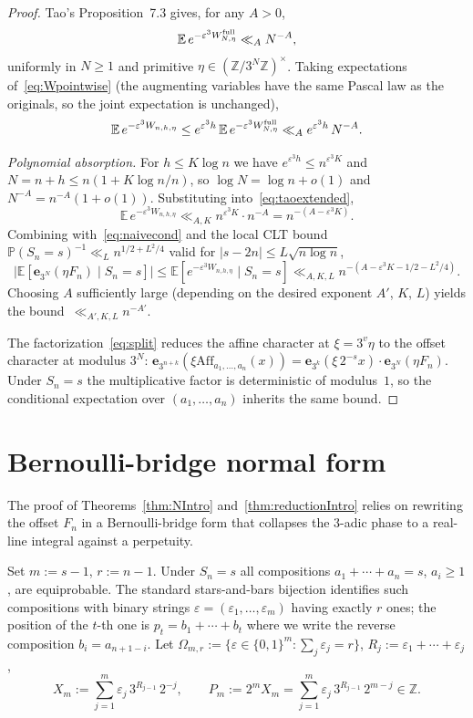 \documentclass[11pt,a4paper]{amsart}
\theoremstyle{plain}
\theoremstyle{definition}
\newcommand{\Z}{\mathbb{Z}}
\newcommand{\E}{\mathbb{E}}
\newcommand{\PP}{\mathbb{P}}
\newcommand{\Aff}{\mathrm{Aff}}
\begin{document}
\begin{proof}
Tao's Proposition~7.3 \cite[\S7.5]{Tao} gives, for any $A>0$,
\begin{equation}\label{eq:taop73}
\E\,e^{-\varepsilon^3 W^{\rm full}_{N,\eta}}\ll_A N^{-A},
\end{equation}
uniformly in $N\ge 1$ and primitive $\eta\in(\Z/3^N\Z)^\times$.
Taking expectations of~\eqref{eq:Wpointwise} (the augmenting variables
have the same Pascal law as the originals, so the joint expectation is
unchanged),
\begin{equation}\label{eq:taoextended}
\E\,e^{-\varepsilon^3 W_{n,h,\eta}}\le e^{\varepsilon^3 h}\,\E\,e^{-\varepsilon^3 W^{\rm full}_{N,\eta}}\ll_A e^{\varepsilon^3 h}\,N^{-A}.
\end{equation}

\emph{Polynomial absorption.}
For $h\le K\log n$ we have $e^{\varepsilon^3 h}\le n^{\varepsilon^3 K}$ and
$N=n+h\le n(1+K\log n/n)$, so $\log N=\log n+o(1)$ and
$N^{-A}=n^{-A}(1+o(1))$.
Substituting into~\eqref{eq:taoextended},
$$
\E\,e^{-\varepsilon^3 W_{n,h,\eta}}\ll_{A,K} n^{\varepsilon^3 K}\cdot n^{-A}=n^{-(A-\varepsilon^3 K)}.
$$
Combining with~\eqref{eq:naivecond} and the local CLT bound
$\PP(S_n=s)^{-1}\ll_L n^{1/2+L^2/4}$ valid for $|s-2n|\le L\sqrt{n\log n}$,
$$
\bigl|\E[\mathbf e_{3^N}(\eta F_n)\mid S_n=s]\bigr|
\le \E[e^{-\varepsilon^3 W_{n,h,\eta}}\mid S_n=s]
\ll_{A,K,L} n^{-(A-\varepsilon^3 K-1/2-L^2/4)}.
$$
Choosing $A$ sufficiently large (depending on the desired exponent
$A'$, $K$, $L$) yields the bound~$\ll_{A',K,L}n^{-A'}$.

The factorization~\eqref{eq:split} reduces the affine character at
$\xi=3^v\eta$ to the offset character at modulus $3^N$:
$\mathbf e_{3^{n+k}}(\xi\Aff_{a_1,\dots,a_n}(x))
=\mathbf e_{3^k}(\xi\,2^{-s}x)\cdot\mathbf e_{3^N}(\eta F_n)$.
Under $S_n=s$ the multiplicative factor is deterministic of modulus~$1$,
so the conditional expectation over $(a_1,\dots,a_n)$ inherits the same
bound.
\end{proof}

\section{Bernoulli-bridge normal form}\label{sec:bridge}

The proof of Theorems~\ref{thm:NIntro} and~\ref{thm:reductionIntro}
relies on rewriting the offset $F_n$ in a Bernoulli-bridge form that
collapses the $3$-adic phase to a real-line integral against a perpetuity.

Set $m:=s-1$, $r:=n-1$.
Under $S_n=s$ all compositions $a_1+\cdots+a_n=s$, $a_i\ge1$, are
equiprobable.
The standard stars-and-bars bijection identifies such compositions with
binary strings $\varepsilon=(\varepsilon_1,\dots,\varepsilon_m)$ having
exactly $r$ ones; the position of the $t$-th one is $p_t=b_1+\cdots+b_t$
where we write the reverse composition $b_i=a_{n+1-i}$.
Let
$\Omega_{m,r}:=\{\varepsilon\in\{0,1\}^m:\sum_j\varepsilon_j=r\}$,
$R_j:=\varepsilon_1+\cdots+\varepsilon_j$,
\begin{equation}\label{eq:Xm}
X_m:=\sum_{j=1}^m\varepsilon_j\,3^{R_{j-1}}\,2^{-j},\qquad
P_m:=2^m X_m=\sum_{j=1}^m\varepsilon_j\,3^{R_{j-1}}\,2^{m-j}\in\Z.
\end{equation}
\end{document}
